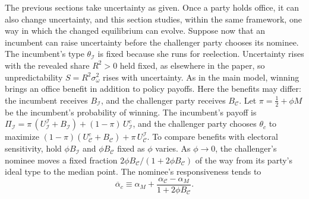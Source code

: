 \documentclass[12pt,letterpaper]{article}
\begin{document}
The previous sections take uncertainty as given. Once a party holds office, it can also change uncertainty, and this section studies, within the same framework, one way in which the changed equilibrium can evolve. Suppose now that an incumbent can raise uncertainty before the challenger party chooses its nominee. The incumbent's type $\theta_{\mathcal I}$ is fixed because she runs for reelection. Uncertainty rises with the revealed share $R^2>0$ held fixed, as elsewhere in the paper, so unpredictability $S=R^2 \sigma_\omega^2$ rises with uncertainty. As in the main model, winning brings an office benefit in addition to policy payoffs. Here the benefits may differ: the incumbent receives $B_{\mathcal I}$, and the challenger party receives $B_{\mathcal C}$. Let $\pi=\tfrac12+\phi M$ be the incumbent's probability of winning. The incumbent's payoff is $\Pi_{\mathcal I}=\pi\,(U_{\mathcal I}^{\mathcal I}+B_{\mathcal I})+(1-\pi)\,U_{\mathcal I}^c$, and the challenger party chooses $\theta_c$ to maximize $(1-\pi)(U_{\mathcal C}^c+B_{\mathcal C})+\pi\,U_{\mathcal C}^{\mathcal I}$. To compare benefits with electoral sensitivity, hold $\phi B_{\mathcal I}$ and $\phi B_{\mathcal C}$ fixed as $\phi$ varies. As $\phi\to0$, the challenger's nominee moves a fixed fraction $2\phi B_{\mathcal C}/(1+2\phi B_{\mathcal C})$ of the way from its party's ideal type to the median point. The nominee's responsiveness tends to
\[
\overline{\alpha}_c\equiv\alpha_M+\frac{\alpha_{\mathcal C}-\alpha_M}{1+2\phi B_{\mathcal C}}.
\]
\end{document}
